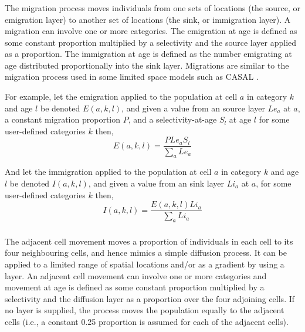 \subsubsection{}

The migration process moves individuals from one sets of locations (the source, or emigration layer) to another set of locations (the sink, or immigration layer). A migration can involve one or more categories. The emigration at age is defined as some constant proportion multiplied by a selectivity and the source layer applied as a proportion. The immigration at age is defined as the number emigrating at age distributed proportionally into the sink layer. Migrations are similar to the migration process used in some limited space models such as CASAL \citep{1388}.

For example, let the emigration applied to the population at cell $a$ in category $k$ and age $l$ be denoted $E(a,k,l)$, and given a value from an source layer $Le_a$  at $a$, a constant migration proportion $P$, and a selectivity-at-age $S_l$ at age $l$ for some user-defined categories $k$ then, 
\begin{equation}
  E(a,k,l) = \frac{P Le_a S_l }{\sum\limits_a Le_a}
\end{equation}

And let the immigration applied to the population at cell $a$ in category $k$ and age $l$ be denoted $I(a,k,l)$, and given a value from an sink layer $Li_a$  at $a$, for some user-defined categories $k$ then, 
\begin{equation}
  I(a,k,l) = \frac{E(a,k,l) Li_a }{\sum\limits_a Li_a} 
\end{equation}

\subsubsection{}

The adjacent cell movement moves a proportion of individuals in each cell to its four neighbouring cells, and hence mimics a simple diffusion process. It can be applied to a limited range of spatial locations and/or as a gradient by using a layer. An adjacent cell movement can involve one or more categories and movement at age is defined as some constant proportion multiplied by a selectivity and the diffusion layer as a proportion over the four adjoining cells. If no layer is supplied, the process moves the population equally to the adjacent cells (i.e., a constant 0.25 proportion is assumed for each of the adjacent cells).

